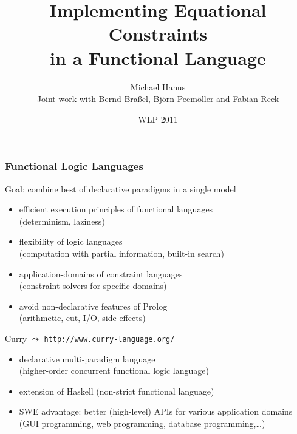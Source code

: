 \documentclass[10pt]{beamer}
\date{WLP 2011}
\author[Michael Hanus]{Michael Hanus\\[2ex]
{\small Joint work with Bernd Bra\ss{}el, Bj\"orn Peem\"oller and Fabian Reck}}
\institute[CAU Kiel]{Christian-Albrechts-University of Kiel\\
  Programming Languages and Compiler Construction}
\begin{document}

\title[Implementing Equational Constraints in a Functional Language]
      {Implementing Equational Constraints\\
       in a Functional Language}
\frame{\titlepage}


\begin{frame}[fragile]
\frametitle{Functional Logic Languages}

\begin{block}{Goal: combine best of declarative paradigms in a single model}
\begin{itemize}%
\item {\blue efficient execution} principles of functional languages\\
(determinism, laziness)
\item {\blue flexibility} of logic languages\\
(computation with partial information, built-in search)
\item {\blue application-domains} of constraint languages\\
(constraint solvers for specific domains)
\item avoid non-declarative features of Prolog\\
(arithmetic, cut, I/O, side-effects)
\end{itemize}
\end{block}
\vfill
\pause

\begin{block}{Curry {} $\leadsto$ {\tt http://www.curry-language.org/}}
\begin{itemize}%
\item declarative multi-paradigm language\\
 (higher-order concurrent functional logic language)
\item extension of Haskell (non-strict functional language)
\item SWE advantage: better (high-level) APIs for various application domains\\
(GUI programming, web programming, database programming,\ldots)
\end{itemize}
\end{block}
\end{frame}
\end{document}
